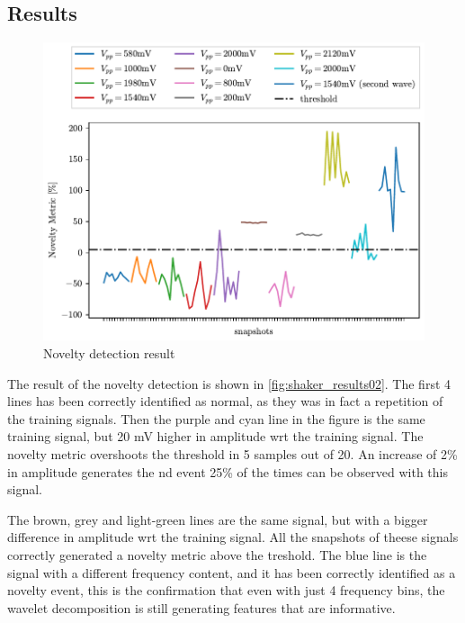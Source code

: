 \subsection{Results}
\begin{figure}
    \centering
    \includegraphics{Images/shaker/Test02.pdf}
    \caption{Novelty detection result}
    \label{fig:shaker_results02}
\end{figure}
The result of the novelty detection is shown in \autoref{fig:shaker_results02}. The first 4 lines has been correctly identified as normal, as they was in fact a repetition of the training signals.
Then the purple and cyan line in the figure is the same training signal, but 20 mV higher in amplitude \gls{wrt} the training signal. The novelty metric overshoots the threshold in 5 samples out of 20. An increase of 2\% in amplitude generates the \gls{nd} event 25\% of the times can be observed with this signal. 

The brown, grey and light-green lines are the same signal, but with a bigger difference in amplitude \gls{wrt} the training signal. All the snapshots of theese signals correctly generated a novelty metric above the treshold. The blue line is the signal with a different frequency content, and it has been correctly identified as a novelty event, this is the confirmation that even with just 4 frequency bins, the wavelet decomposition is still generating features that are informative.

